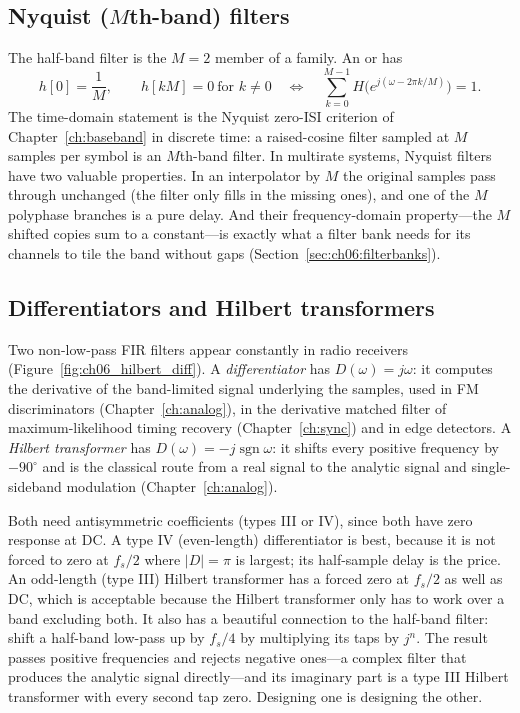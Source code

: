 \subsection{Nyquist (\texorpdfstring{$M$}{M}th-band) filters}

The half-band filter is the $M=2$ member of a family. An  or 
has
\begin{equation}
h[0]=\frac1M,\qquad h[kM]=0\ \text{for } k\ne0
\quad\Longleftrightarrow\quad
\sum_{k=0}^{M-1}H\bigl(e^{j(\omega-2\pi k/M)}\bigr)=1.
\end{equation}
The time-domain statement is the Nyquist zero-ISI criterion of Chapter~\ref{ch:baseband} in
discrete time: a raised-cosine filter sampled at $M$ samples per symbol is an $M$th-band filter.
In multirate systems, Nyquist filters have two valuable properties. In an interpolator by $M$ the
original samples pass through unchanged (the filter only fills in the missing ones), and one of
the $M$ polyphase branches is a pure delay. And their frequency-domain property---the $M$ shifted
copies sum to a constant---is exactly what a filter bank needs for its channels to tile the band
without gaps (Section~\ref{sec:ch06:filterbanks}).

\subsection{Differentiators and Hilbert transformers}

Two non-low-pass FIR filters appear constantly in radio receivers (Figure~\ref{fig:ch06_hilbert_diff}).
A \emph{differentiator} has $D(\omega)=j\omega$: it computes the derivative of the band-limited
signal underlying the samples, used in FM discriminators (Chapter~\ref{ch:analog}), in the
derivative matched filter of maximum-likelihood timing recovery (Chapter~\ref{ch:sync}) and in edge
detectors. A \emph{Hilbert transformer} has $D(\omega)=-j\operatorname{sgn}\omega$: it shifts every
positive frequency by $-90^\circ$ and is the classical route from a real signal to the analytic
signal and single-sideband modulation (Chapter~\ref{ch:analog}).

Both need antisymmetric coefficients (types III or IV), since both have zero response at DC. A
type IV (even-length) differentiator is best, because it is not forced to zero at $f_s/2$ where
$|D|=\pi$ is largest; its half-sample delay is the price. An odd-length (type III) Hilbert
transformer has a forced zero at $f_s/2$ as well as DC, which is acceptable because the Hilbert
transformer only has to work over a band excluding both. It also has a beautiful connection to the
half-band filter: shift a half-band low-pass up by $f_s/4$ by multiplying its taps by $j^n$. The
result passes positive frequencies and rejects negative ones---a complex filter that produces the
analytic signal directly---and its imaginary part is a type III Hilbert transformer with every
second tap zero. Designing one is designing the other.


